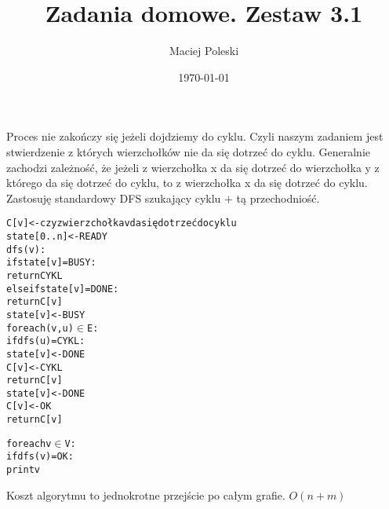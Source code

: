 \documentclass[a4paper,12pt]{article}
\title{Zadania domowe. Zestaw 3.1}
\author{Maciej Poleski}
\date{\today}
\begin{document}
\maketitle

\newpage

\section{}
Proces nie zakończy się jeżeli dojdziemy do cyklu. Czyli naszym zadaniem jest stwierdzenie z których wierzchołków nie da się dotrzeć do cyklu. Generalnie zachodzi zależność, że jeżeli z wierzchołka x da się dotrzeć do wierzchołka y z którego da się dotrzeć do cyklu, to z wierzchołka x da się dotrzeć do cyklu. Zastosuję standardowy DFS szukający cyklu + tą przechodniość.
\begin{alltt}
 C[v] <- czy z wierzchołka v da się dotrzeć do cyklu
 state[0..n] <- READY
 dfs(v):
    if state[v] = BUSY:
        return CYKL
    else if state[v] = DONE:
        return C[v]
    state[v] <- BUSY
    for each (v,u) \(\in\) E:
        if dfs(u) = CYKL:
            state[v] <- DONE
            C[v] <- CYKL
            return C[v]
    state[v] <- DONE
    C[v] <- OK
    return C[v]
    
 for each v \(\in\) V:
    if dfs(v) = OK:
        print v
    
\end{alltt}
Koszt algorytmu to jednokrotne przejście po całym grafie. $O(n+m)$
\end{document}
